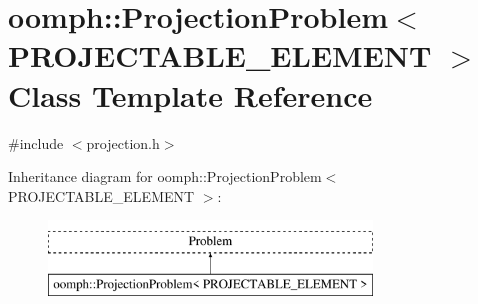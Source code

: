 \hypertarget{classoomph_1_1ProjectionProblem}{}\section{oomph\+:\+:Projection\+Problem$<$ P\+R\+O\+J\+E\+C\+T\+A\+B\+L\+E\+\_\+\+E\+L\+E\+M\+E\+NT $>$ Class Template Reference}
\label{classoomph_1_1ProjectionProblem}


{\ttfamily \#include $<$projection.\+h$>$}

Inheritance diagram for oomph\+:\+:Projection\+Problem$<$ P\+R\+O\+J\+E\+C\+T\+A\+B\+L\+E\+\_\+\+E\+L\+E\+M\+E\+NT $>$\+:\begin{figure}[H]
\begin{center}
\leavevmode
\includegraphics[height=2.000000cm]{classoomph_1_1ProjectionProblem}
\end{center}
\end{figure}
